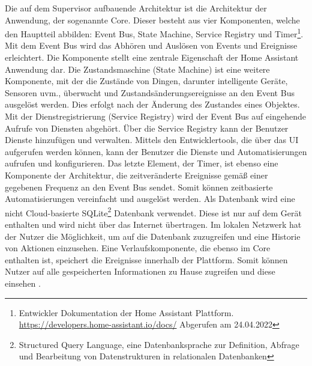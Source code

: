    Die auf dem Supervisor aufbauende Architektur ist die Architektur der Anwendung, der sogenannte Core. Dieser besteht aus vier 
    Komponenten, welche den Hauptteil abbilden: Event Bus, State Machine, Service Registry und Timer\footnote{Entwickler Dokumentation der Home Assistant Plattform. \url{https://developers.home-assistant.io/docs/} Abgerufen am 24.04.2022}. 
    \\
    Mit dem Event Bus wird das Abhören und Auslösen von Events und Ereignisse erleichtert. Die Komponente stellt eine zentrale Eigenschaft 
    der Home Assistant Anwendung dar. Die Zustandsmaschine (State Machine) ist eine weitere Komponente, mit der die Zustände von Dingen, darunter 
    intelligente Geräte, Sensoren uvm., überwacht und Zustandsänderungsereignisse an den Event Bus ausgelöst werden. Dies erfolgt nach der 
    Änderung des Zustandes eines Objektes. Mit der Dienstregistrierung (Service Registry) wird der Event Bus auf eingehende Aufrufe von 
    Diensten abgehört. Über die Service Registry kann der Benutzer Dienste hinzufügen und verwalten. Mittels den Entwicklertools, die über das 
    \ac{UI} aufgerufen werden können, kann der Benutzer die Dienste und Automatisierungen aufrufen und konfigurieren. Das letzte 
    Element, der Timer, ist ebenso eine Komponente der Architektur, die zeitveränderte Ereignisse gemäß einer gegebenen Frequenz 
    an den Event Bus sendet. Somit können zeitbasierte Automatisierungen vereinfacht und ausgelöst werden. Als Datenbank wird eine 
    nicht Cloud-basierte SQLite\footnote{Structured Query Language, eine Datenbanksprache zur Definition, Abfrage und Bearbeitung von Datenstrukturen in relationalen Datenbanken} 
    Datenbank verwendet. Diese ist nur auf dem Gerät enthalten und wird nicht über das Internet übertragen. 
    Im lokalen Netzwerk hat der Nutzer die Möglichkeit, um auf die Datenbank zuzugreifen und eine Historie von Aktionen einzusehen. 
    Eine Verlaufskomponente, die ebenso im Core enthalten ist, speichert die Ereignisse innerhalb der Plattform. Somit können Nutzer auf 
    alle gespeicherten Informationen zu Hause zugreifen und diese einsehen \cite{HAOSarchitecture2018}.
    \\
    \linebreak
